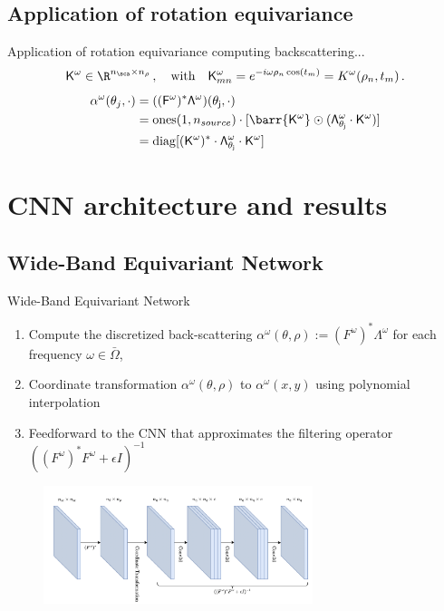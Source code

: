 \documentclass{beamer}
\begin{document}
\subsection{Application of rotation equivariance}
\begin{frame}{Application of rotation equivariance computing backscattering...}
\[
\mathsf{K}^\omega \in \R^{n_\sca\times n_\rho}\,,\quad\text{with}\quad \mathsf{K}^\omega_{mn} = e^{-i\omega\rho_n\cos(t_m)} = K^\omega(\rho_n,t_m)\,.
\]
\begin{align*}
\alpha^\omega(\theta_j,\cdot) &= \sf((F^\omega)^*\Lambda^\omega)(\theta_j,\cdot) \\
&= \operatorname{ones}(1,n_{source})\cdot [\barr{\mathsf{K}^\omega} \odot (\sf\Lambda^\omega_{\theta_j}\cdot \mathsf{K}^\omega )] \\
&= \operatorname{diag}[(\mathsf{K}^\omega)^\ast \cdot \sf\Lambda^\omega_{\theta_j}\cdot \mathsf{K}^\omega]
\end{align*}
\end{frame}

\section{CNN architecture and results}
\subsection{Wide-Band Equivariant Network}
\begin{frame}{Wide-Band Equivariant Network}
    \begin{enumerate}
        \item Compute the discretized back-scattering $\alpha^\omega(\theta, \rho) := (F^\omega)^*\Lambda^\omega$ for each frequency $\omega \in \bar{\Omega}$, 
        \item Coordinate transformation $\alpha^\omega (\theta, \rho)$ to $\alpha^\omega (x,y)$ using polynomial interpolation
        \item Feedforward to the CNN that approximates the filtering operator $((F^\omega)^* F^\omega + \epsilon I)^{-1}$
    \end{enumerate}
    \begin{figure}
        \centering
        \includegraphics[width=0.7\textwidth]{images/CNN.png}
    \end{figure}
\end{frame}
\end{document}
